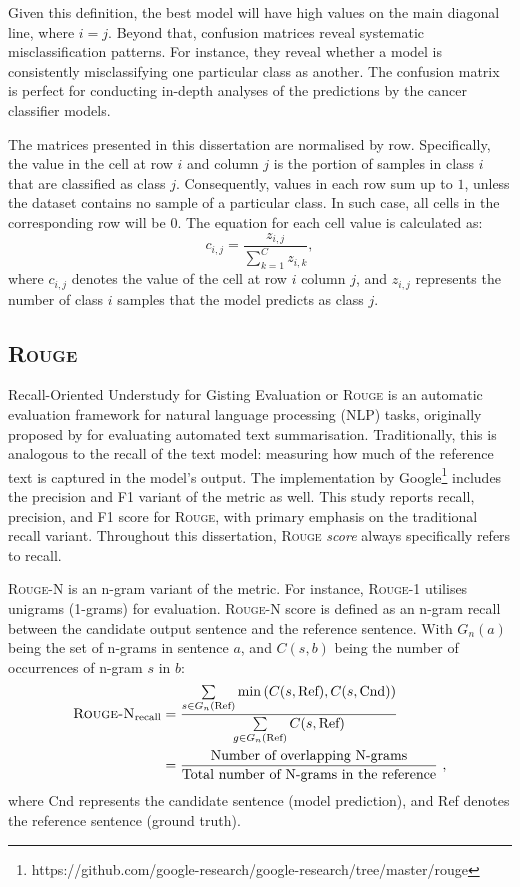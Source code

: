 \documentclass{l4proj}
\begin{document}
Given this definition, the best model will have high values on the main diagonal line, where $i = j$. Beyond that, confusion matrices reveal systematic misclassification patterns. For instance, they reveal whether a model is consistently misclassifying one particular class as another. The confusion matrix is perfect for conducting in-depth analyses of the predictions by the cancer classifier models.

The matrices presented in this dissertation are normalised by row. Specifically, the value in the cell at row $i$ and column $j$ is the portion of samples in class $i$ that are classified as class $j$. Consequently, values in each row sum up to $1$, unless the dataset contains no sample of a particular class. In such case, all cells in the corresponding row will be $0$. The equation for each cell value is calculated as:
\begin{equation}
    c_{i,j} = \frac{z_{i, j}}{\sum\limits_{k=1}^C z_{i,k}},
\end{equation}
where $c_{i,j}$ denotes the value of the cell at row $i$ column $j$, and $z_{i,j}$ represents the number of class $i$ samples that the model predicts as class $j$.

\subsection{\textsc{Rouge}}
Recall-Oriented Understudy for Gisting Evaluation or \textsc{Rouge} is an automatic evaluation framework for natural language processing (NLP) tasks, originally proposed by \cite{lin2004} for evaluating automated text summarisation. Traditionally, this is analogous to the recall of the text model: measuring how much of the reference text is captured in the model's output. The implementation by Google\footnote{https://github.com/google-research/google-research/tree/master/rouge} includes the precision and F1 variant of the metric as well. This study reports recall, precision, and F1 score for \textsc{Rouge}, with primary emphasis on the traditional recall variant. Throughout this dissertation, \textsc{Rouge} \emph{score} always specifically refers to recall.

\textsc{Rouge-N} is an n-gram variant of the metric. For instance, \textsc{Rouge-1} utilises unigrams (1-grams) for evaluation. \textsc{Rouge-N} score is defined as an n-gram recall between the candidate output sentence and the reference sentence. With $G_n(a)$ being the set of n-grams in sentence $a$, and $C(s, b)$ being the number of occurrences of n-gram $s$ in $b$:
\begin{equation}
\begin{split}    
    \textsc{Rouge-N}_{\text{recall}} &= \frac{\sum\limits_{s \in G_n(\text{Ref})}\min\left( C(s, \text{Ref}), C(s, \text{Cnd})\right)}{\sum\limits_{g \in G_n(\text{Ref})}C(s, \text{Ref})} \\
    &= \frac{\text{Number of overlapping N-grams}}{\text{Total number of N-grams in the reference}}\ ,
\end{split}
\end{equation}
where Cnd represents the candidate sentence (model prediction), and Ref denotes the reference sentence (ground truth).
\end{document}
